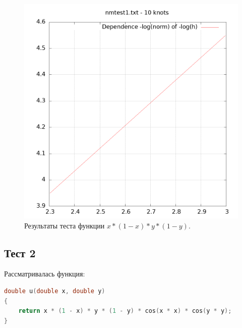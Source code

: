 \documentclass[14pt,a4paper]{extarticle}
\newcommand{\1}{\mathbbm{1}}
\begin{document}
\begin{figure}
    \centering
    \includegraphics[scale=0.5]{Images/nmtest1.txt.png}
    \caption{Результаты теста функции $x * (1 - x) * y * (1 - y)$.}
\end{figure}


\subsection{Тест 2}
Рассматривалась функция:
\begin{lstlisting}[language=c]
    double u(double x, double y)
{
    return x * (1 - x) * y * (1 - y) * cos(x * x) * cos(y * y);
}
    \end{lstlisting}
\end{document}
